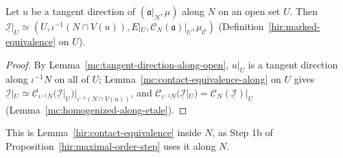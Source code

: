 \begin{lemma}
\label{mc:contact-equivalence-open-along}
\leanok
Let \(u\) be a tangent direction of \((\mathfrak a|_N,\mu)\) along \(N\) on an open set \(U\). Then
\(\underline{\mathcal I}|_U\simeq(U,\iota^{-1}(N\cap V(u)),E|_U,\mathcal C_N(\mathfrak a)|_U,\mu_{\mathcal C})\) (Definition~\ref{hir:marked-equivalence} on \(U\)).
\end{lemma}
\begin{proof}
\leanok
By Lemma~\ref{mc:tangent-direction-along-open}, \(u|_U\) is a tangent direction along \(\iota^{-1}N\) on all of \(U\); Lemma~\ref{mc:contact-equivalence-along} on \(U\) gives
\(\underline{\mathcal I}|_U\simeq\mathcal C_{\iota^{-1}N}(\underline{\mathcal I}|_U)|_{\iota^{-1}(N\cap V(u))}\), and \(\mathcal C_{\iota^{-1}N}(\underline{\mathcal I}|_U)=\mathcal C_N(\underline{\mathcal I})|_U\)
(Lemma~\ref{mc:homogenized-along-etale}).
\end{proof}
This is Lemma~\ref{hir:contact-equivalence} inside \(N\), as Step 1b of Proposition~\ref{hir:maximal-order-step} uses it along \(N\).

